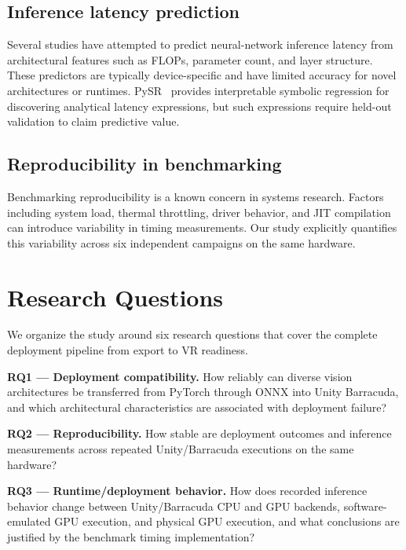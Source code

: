 \documentclass[10pt,twocolumn,letterpaper]{article}
\begin{document}
\subsection{Inference latency prediction}

Several studies have attempted to predict neural-network inference latency from architectural features such as FLOPs, parameter count, and layer structure. These predictors are typically device-specific and have limited accuracy for novel architectures or runtimes. PySR~\cite{cranmer2023pysr} provides interpretable symbolic regression for discovering analytical latency expressions, but such expressions require held-out validation to claim predictive value.

\subsection{Reproducibility in benchmarking}

Benchmarking reproducibility is a known concern in systems research. Factors including system load, thermal throttling, driver behavior, and JIT compilation can introduce variability in timing measurements. Our study explicitly quantifies this variability across six independent campaigns on the same hardware.

\section{Research Questions}\label{sec:rqs}

We organize the study around six research questions that cover the complete deployment pipeline from export to VR readiness.

\medskip
\noindent\textbf{RQ1 --- Deployment compatibility.}
How reliably can diverse vision architectures be transferred from PyTorch through ONNX into Unity Barracuda, and which architectural characteristics are associated with deployment failure?

\noindent\textbf{RQ2 --- Reproducibility.}
How stable are deployment outcomes and inference measurements across repeated Unity/Barracuda executions on the same hardware?

\noindent\textbf{RQ3 --- Runtime/deployment behavior.}
How does recorded inference behavior change between Unity/Barracuda CPU and GPU backends, software-emulated GPU execution, and physical GPU execution, and what conclusions are justified by the benchmark timing implementation?
\end{document}
